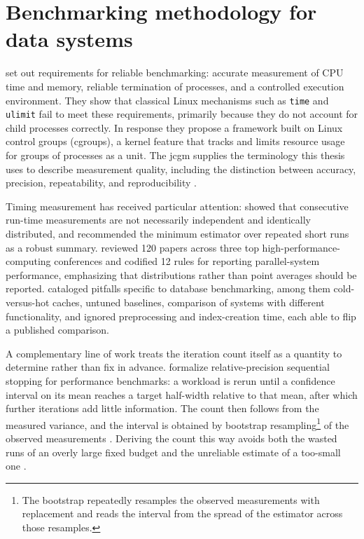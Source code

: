 \section{Benchmarking methodology for data systems}
\label{related-work:benchmarking-methodology-for-data-systems}

\textcite{beyer_2015_benchmarking_and_resource_measurement} set out requirements for reliable benchmarking: accurate measurement of CPU time and memory, reliable termination of processes, and a controlled execution environment. They show that classical Linux mechanisms such as \texttt{time} and \texttt{ulimit} fail to meet these requirements, primarily because they do not account for child processes correctly. In response they propose a framework built on Linux control groups (cgroups), a kernel feature that tracks and limits resource usage for groups of processes as a unit. The \acrfull{jcgm} supplies the terminology this thesis uses to describe measurement quality, including the distinction between accuracy, precision, repeatability, and reproducibility \parencite{jcgm2012_international_vocabulary_of_metrology}.

Timing measurement has received particular attention: \textcite{chen2016_robust_benchmarking_noisy_environments} showed that consecutive run-time measurements are not necessarily independent and identically distributed, and recommended the minimum estimator over repeated short runs as a robust summary. \textcite{hoefler2015_scientific_benchmarking_parallel} reviewed \num{120} papers across three top high-performance-computing conferences and codified \num{12} rules for reporting parallel-system performance, emphasizing that distributions rather than point averages should be reported. \textcite{raasveldt2018_fair_benchmarking_database_systems} cataloged pitfalls specific to database benchmarking, among them cold-versus-hot caches, untuned baselines, comparison of systems with different functionality, and ignored preprocessing and index-creation time, each able to flip a published comparison.

A complementary line of work treats the iteration count itself as a quantity to determine rather than fix in advance. \textcite{georges2007_statistically_rigorous_java_performance} formalize relative-precision sequential stopping for performance benchmarks: a workload is rerun until a confidence interval on its mean reaches a target half-width relative to that mean, after which further iterations add little information. The count then follows from the measured variance, and the interval is obtained by bootstrap resampling\footnote{The bootstrap repeatedly resamples the observed measurements with replacement and reads the interval from the spread of the estimator across those resamples.} of the observed measurements \parencite{laaber2019_software_microbenchmarking_cloud}. Deriving the count this way avoids both the wasted runs of an overly large fixed budget and the unreliable estimate of a too-small one \parencite{georges2007_statistically_rigorous_java_performance}.

